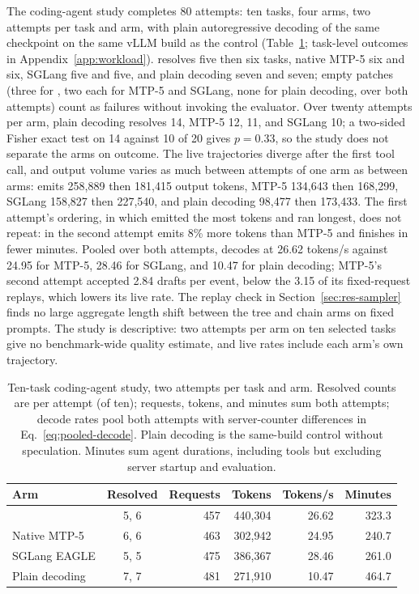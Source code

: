 The coding-agent study completes 80 attempts: ten tasks, four arms, two attempts per task and arm, with plain autoregressive decoding of the same checkpoint on the same vLLM build as the control (Table~\ref{tab:agent-study}; task-level outcomes in Appendix~\ref{app:workload}). \sys{} resolves five then six tasks, native MTP-5 six and six, SGLang five and five, and plain decoding seven and seven; empty patches (three for \sys{}, two each for MTP-5 and SGLang, none for plain decoding, over both attempts) count as failures without invoking the evaluator. Over twenty attempts per arm, plain decoding resolves 14, MTP-5 12, \sys{} 11, and SGLang 10; a two-sided Fisher exact test on 14 against 10 of 20 gives $p=0.33$, so the study does not separate the arms on outcome. The live trajectories diverge after the first tool call, and output volume varies as much between attempts of one arm as between arms: \sys{} emits 258,889 then 181,415 output tokens, MTP-5 134,643 then 168,299, SGLang 158,827 then 227,540, and plain decoding 98,477 then 173,433. The first attempt's ordering, in which \sys{} emitted the most tokens and ran longest, does not repeat: in the second attempt \sys{} emits 8\% more tokens than MTP-5 and finishes in fewer minutes. Pooled over both attempts, \sys{} decodes at 26.62 tokens/s against 24.95 for MTP-5, 28.46 for SGLang, and 10.47 for plain decoding; MTP-5's second attempt accepted 2.84 drafts per event, below the 3.15 of its fixed-request replays, which lowers its live rate. The replay check in Section~\ref{sec:res-sampler} finds no large aggregate length shift between the tree and chain arms on fixed prompts. The study is descriptive: two attempts per arm on ten selected tasks give no benchmark-wide quality estimate, and live rates include each arm's own trajectory.

\begin{table}[t]
\caption{Ten-task coding-agent study, two attempts per task and arm. Resolved counts are per attempt (of ten); requests, tokens, and minutes sum both attempts; decode rates pool both attempts with server-counter differences in Eq.~\ref{eq:pooled-decode}. Plain decoding is the same-build control without speculation. Minutes sum agent durations, including tools but excluding server startup and evaluation.}
\label{tab:agent-study}
\centering\small
\setlength{\tabcolsep}{3pt}
\begin{tabular}{@{}lcrrrr@{}}
\toprule
Arm & Resolved & Requests & Tokens & Tokens/s & Minutes \\
\midrule
\sys{} & 5, 6 & 457 & 440,304 & 26.62 & 323.3 \\
Native MTP-5 & 6, 6 & 463 & 302,942 & 24.95 & 240.7 \\
SGLang EAGLE & 5, 5 & 475 & 386,367 & 28.46 & 261.0 \\
Plain decoding & 7, 7 & 481 & 271,910 & 10.47 & 464.7 \\
\bottomrule
\end{tabular}
\end{table}
